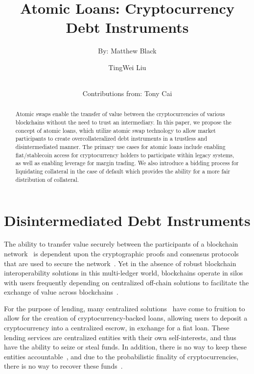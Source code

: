 \documentclass{llncs}
\begin{document}
\title{Atomic Loans: Cryptocurrency Debt Instruments}

\author{By: Matthew Black  \and
TingWei Liu  \and \\
Contributions from: Tony Cai}
%

%
\maketitle              %
%
\begin{abstract}
Atomic swaps enable the transfer of value between the cryptocurrencies of various blockchains without the need to trust an intermediary. In this paper, we propose the concept of atomic loans, which utilize atomic swap technology to allow market participants to create overcollateralized debt instruments in a trustless and disintermediated manner. The primary use cases for atomic loans include enabling fiat/stablecoin access for cryptocurrency holders to participate within legacy systems, as well as enabling leverage for margin trading. We also introduce a bidding process for liquidating collateral in the case of default which provides the ability for a more fair distribution of collateral.

\end{abstract}
%
%
%
\section{Disintermediated Debt Instruments}

The ability to transfer value securely between the participants of a blockchain network~\cite{ref_article1} is dependent upon the cryptographic proofs and consensus protocols that are used to secure the network~\cite{ref_article2}. Yet in the absence of robust blockchain interoperability solutions in this multi-ledger world, blockchains operate in silos with users frequently depending on centralized off-chain solutions to facilitate the exchange of value across blockchains~\cite{ref_article3}.


For the purpose of lending, many centralized solutions~\cite{ref_article4} have come to fruition to allow for the creation of cryptocurrency-backed loans, allowing users to deposit  a cryptocurrency into a centralized escrow, in exchange for a fiat loan. These lending services are centralized entities with their own self-interests, and thus have the ability to seize or steal funds. In addition, there is no way to keep these entities accountable~\cite{ref_article5}, and due to the probabilistic finality of cryptocurrencies, there is no way to recover these funds~\cite{ref_article6}. 
\end{document}
